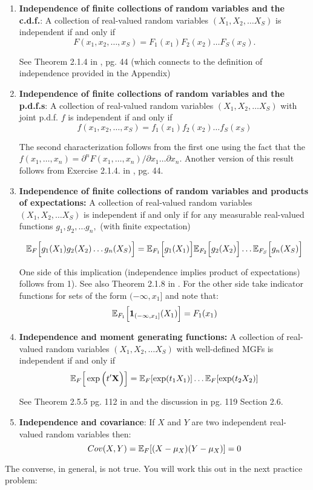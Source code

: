 \documentclass[11pt]{article} %
\begin{document}
\begin{enumerate}
\item \textbf{Independence of finite collections of random variables and the c.d.f.}: A collection of real-valued random variables $(X_1, X_2, \ldots X_S)$ is independent if and only if 
\begin{equation*}
F (x_1, x_2, \ldots ,x_S) = F_1(x_1)F_2(x_2) \ldots F_S(x_S).     
\end{equation*}

See Theorem 2.1.4 in \cite{durrett2010}, pg. 44 (which connects to the definition of independence provided in the Appendix)


\item \textbf{Independence of finite collections of random variables and the p.d.f.s}: A collection of real-valued random variables $(X_1, X_2, \ldots X_S)$ with joint p.d.f. $f$ is independent if and only if 
\begin{equation*}
f (x_1, x_2, \ldots ,x_S) = f_{1}(x_1)f_{2}(x_2) \ldots f_{S}(x_S)     
\end{equation*}

\noindent The second characterization follows from the first one using the fact that the $f(x_1, \ldots, x_n) = \partial^n F(x_1, \ldots, x_n)/ \partial x_1 \ldots \partial x_n$. Another version of this result follows from Exercise 2.1.4. in \cite{durrett2010}, pg. 44. 

\item \textbf{Independence of finite collections of random variables and products of expectations:} A collection of real-valued random variables $(X_1, X_2, \ldots X_S)$ is independent if and only if for any measurable real-valued functions $g_1, g_2, \ldots g_n,$ (with finite expectation)

$$\mathbb{E}_{F} \Big[ g_1(X_1) g_2(X_2) \ldots g_n(X_S) \Big] = \mathbb{E}_{F_{1}} \Big[ g_1(X_1) \Big] \mathbb{E}_{F_{2}} \Big[ g_2(X_2) \Big] \ldots \mathbb{E}_{F_{S}} \Big[ g_n(X_S) \Big]  $$

\noindent One side of this implication (independence implies product of expectations) follows from 1). See also Theorem 2.1.8 in \cite{durrett2010}. For the other side take indicator functions for sets of the form $(-\infty, x_1]$ and note that:
$$\mathbb{E}_{F_{1}} \Big[ \mathbf{1}_{(-\infty, x_1]} (X_1) \Big]=F_{1}(x_1)$$

\item \textbf{Independence and moment generating functions:} A collection of real-valued random variables $(X_1, X_2, \ldots X_S)$ with well-defined MGFs is independent if and only if 
$$\mathbb{E}_{F} \Big[ \exp\Big( t' \mathbf{X} \Big) \Big] = \mathbb{E}_{F}[\exp(t_1X_1) ] \ldots \mathbb{E}_{F}[\exp(t_2X_2)]$$

See Theorem 2.5.5 pg. 112 in \cite{hogg} and the discussion in pg. 119 Section 2.6.

\item \textbf{Independence and covariance}: If $X$ and $Y$ are two independent real-valued random variables then:
$$Cov(X,Y)=\mathbb{E}_{F}[(X-\mu_{X})(Y-\mu_{X})]=0$$
\end{enumerate}
The converse, in general, is not true. You will work this out in the next practice problem:
\end{document}
